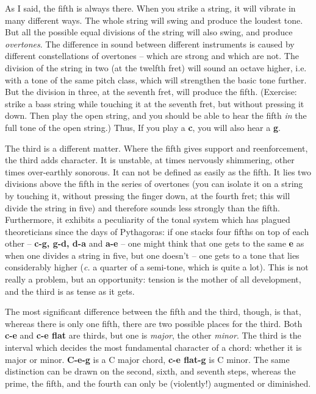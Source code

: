 \begin{articlelayout}
As I said, the fifth is always there. When you strike a string, it
will vibrate in many different ways. The whole string will swing and
produce the loudest tone. But all the possible equal divisions of the
string will also swing, and produce \emph{overtones}. The difference
in sound between different instruments is caused by different
constellations of overtones -- which are strong and which are not. The
division of the string in two (at the twelfth fret) will sound an
octave higher, i.e. with a tone of the same pitch class, which will
strengthen the basic tone further. But the division in three, at the
seventh fret, will produce the fifth. (Exercise: strike a bass string
while touching it at the seventh fret, but without pressing it
down. Then play the open string, and you should be able to hear the
fifth \emph{in} the full tone of the open string.) Thus, If you play a
\textbf{c}, you will also hear a \textbf{g}.

The third is a different matter. Where the fifth gives support and
reenforcement, the third adds character. It is unstable, at times
nervously shimmering, other times over-earthly sonorous. It can not be
defined as easily as the fifth. It lies two divisions above the fifth
in the series of overtones (you can isolate it on a string by touching it,
without pressing the finger down, at the fourth fret; this will divide the string
in five) and therefore sounds less strongly than the
fifth. Furthermore, it exhibits a peculiarity of the tonal system
which has plagued theoreticians since the days of Pythagoras: if one
stacks four fifths on top of each other -- \textbf{c-g, g-d, d-a} and
\textbf{a-e} -- one might think that one gets to the same
\textbf{e} as when one divides a string in five, but one doesn't --
one gets to a tone that lies considerably higher (\emph{c.} a quarter
of a semi-tone, which is quite a lot). This is not really a problem,
but an opportunity: tension is the mother of all development, and the
third is as tense as it gets.

The most significant difference between the fifth and the third,
though, is that, whereas there is only one fifth, there are two
possible places for the third. Both \textbf{c-e} and \textbf{c-e flat}
are thirds, but one is \emph{major}, the other \emph{minor}. The third
is the interval which decides the most fundamental character of a
chord: whether it is major or minor. \textbf{C-e-g} is a C major
chord, \textbf{c-e flat-g}  is C minor. The same distinction can be
drawn on the second, sixth, and seventh steps, whereas the prime, the
fifth, and the fourth can only be (violently!) augmented or
diminished.


\end{articlelayout}
